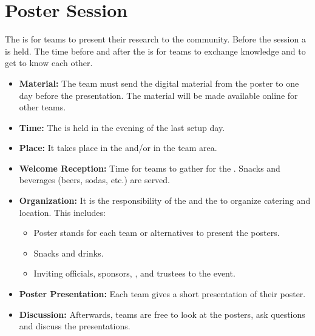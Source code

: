 \section{Poster Session}
\label{sec:setupdays:postersession}
The \PS{} is for teams to present their research to the \AtHome{} community. Before the session a \WelcomeReception{} is held. The time before and after the \PS{} is for teams to exchange knowledge and to get to know each other.
\begin{itemize}
	\item \textbf{Material:} The team must send the digital material from the poster to  one day before the presentation. The material will be made available online for other teams.
	\item \textbf{Time:} The \PS{} is held in the evening of the last setup day.
	\item \textbf{Place:} It takes place in the \Arena{} and/or in the team area.
	\item \textbf{Welcome Reception:} Time for teams to gather for the \PS{}. Snacks and beverages (beers, sodas, etc.) are served.
	\item \textbf{Organization:} It is the responsibility of the  and the  to organize catering and location. This includes:
		\begin{itemize}
			\item Poster stands for each team or alternatives to present the posters. 
			\item Snacks and drinks.
			\item Inviting officials, sponsors, , and \RCF{} trustees to the event.
		\end{itemize}
	\item \textbf{Poster Presentation:} Each team gives a short presentation of their poster.
	\item \textbf{Discussion:} Afterwards, teams are free to look at the posters, ask questions and discuss the presentations.
\end{itemize}

